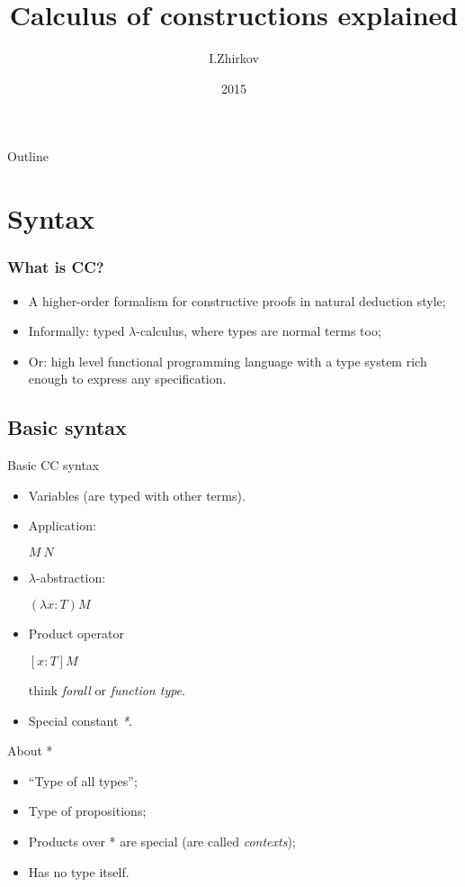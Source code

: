 \documentclass{beamer}
\title[and its variations]{Calculus of constructions explained}
\author{I.Zhirkov}
\date{2015}
\begin{document}
\begin{frame}
  \titlepage
\end{frame}

\begin{frame}{Outline}
  \tableofcontents
\end{frame}

\section{Syntax}
\begin{frame}
\frametitle{What is CC?}
\begin{itemize}
\item A higher-order formalism  for constructive proofs in natural deduction style;
\pause
\item Informally: typed $\lambda$-calculus, where types are normal terms too;
\item Or: high level functional programming language with a type system rich enough to express any specification.
\end{itemize}
\end{frame}


 
\subsection{Basic syntax}
\begin{frame}{Basic CC syntax}
\begin{itemize}
\item Variables (are typed with other terms).
\item Application:

$M \: N$
\item $\lambda$-abstraction:

$ (\lambda x : T ) M $

\item Product operator

$ [x: T] M$

think \textit{forall} or \textit{function type}.
\item Special constant \textit{*}.

\end{itemize}
\end{frame}


\begin{frame}{About *}
\begin{itemize}
\item ``Type of all types'';
\item Type of propositions;
\item Products over * are special (are called \textit{contexts});
\item Has no type itself.
\end{itemize}
\end{frame}
\end{document}
